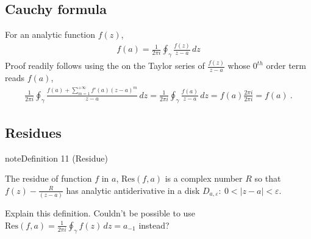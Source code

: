 \documentclass[letterpaper,10pt,english]{jupyterBook}
\begin{document}
\subsection{Cauchy formula}
\label{\detokenize{ch/complex/analysis:cauchy-formula}}\label{\detokenize{ch/complex/analysis:complex-analysis-mero-fun-cauchy-formula}}
\sphinxAtStartPar
For an analytic function \(f(z)\),
\begin{equation*}
\begin{split}f(a) = \frac{1}{2 \pi i} \oint_{\gamma} \frac{f(z)}{z-a} \, dz\end{split}
\end{equation*}
\sphinxAtStartPar
Proof readily follows using the {\hyperref[\detokenize{ch/complex/analysis:complex-analysis-useful-int-path-independence-z-n}]{}} on the Taylor series of \(\frac{f(z)}{z-a}\) whose \(0^{th}\) order term reads \(f(a)\),
\begin{equation*}
\begin{split}\frac{1}{2\pi i} \oint_{\gamma} \frac{f(a)+\sum_{m=1}^{+\infty} f'(a) (z-a)^m}{z-a} \, dz = \frac{1}{2\pi i} \oint_{\gamma} \frac{f(a)}{z-a} \, dz = f(a) \frac{2 \pi i}{2 \pi i} = f(a) \ .\end{split}
\end{equation*}

\subsection{Residues}
\label{\detokenize{ch/complex/analysis:residues}}\label{\detokenize{ch/complex/analysis:complex-analysis-mero-fun-residues}}\label{ch/complex/analysis:definition-5}
\begin{sphinxadmonition}{note}{Definition 11 (Residue)}



\sphinxAtStartPar
The residue of function \(f\) in \(a\), \(\text{Res}(f,a)\) is a complex number \(R\) so that \(f(z) - \frac{R}{(z-a)}\) has analytic antiderivative in a disk \(D_{a,\varepsilon}: \ 0 < |z-a| < \varepsilon\).
\end{sphinxadmonition}

\sphinxAtStartPar
{} Explain this definition. Couldn’t be possible to use \(\text{Res}(f,a) = \frac{1}{2 \pi i} \oint_{\gamma} f(z) \, dz = a_{-1}\) instead?
\end{document}
